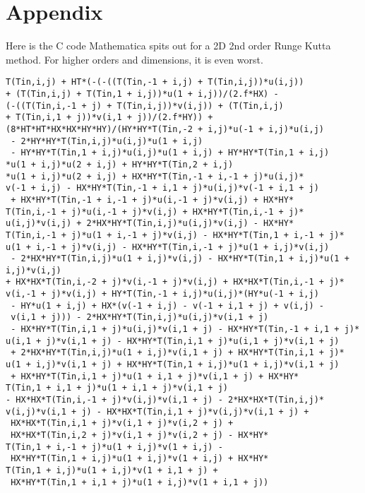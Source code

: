 \documentclass[paper=a4, fontsize=11pt]{scrartcl} %
\numberwithin{equation}{section} %
\numberwithin{figure}{section} %
\numberwithin{table}{section} %
\begin{document}
\newpage

\section{Appendix}
Here is the C code Mathematica spits out for a 2D 2nd order Runge Kutta method. For higher orders and dimensions, it is even worst.
\begin{verbatim}
T(Tin,i,j) + HT*(-(-((T(Tin,-1 + i,j) + T(Tin,i,j))*u(i,j)) 
+ (T(Tin,i,j) + T(Tin,1 + i,j))*u(1 + i,j))/(2.f*HX) - 
(-((T(Tin,i,-1 + j) + T(Tin,i,j))*v(i,j)) + (T(Tin,i,j) 
+ T(Tin,i,1 + j))*v(i,1 + j))/(2.f*HY)) + 
(8*HT*HT*HX*HX*HY*HY)/(HY*HY*T(Tin,-2 + i,j)*u(-1 + i,j)*u(i,j)
 - 2*HY*HY*T(Tin,i,j)*u(i,j)*u(1 + i,j)
 - HY*HY*T(Tin,1 + i,j)*u(i,j)*u(1 + i,j) + HY*HY*T(Tin,1 + i,j)
*u(1 + i,j)*u(2 + i,j) + HY*HY*T(Tin,2 + i,j)
*u(1 + i,j)*u(2 + i,j) + HX*HY*T(Tin,-1 + i,-1 + j)*u(i,j)*
v(-1 + i,j) - HX*HY*T(Tin,-1 + i,1 + j)*u(i,j)*v(-1 + i,1 + j)
 + HX*HY*T(Tin,-1 + i,-1 + j)*u(i,-1 + j)*v(i,j) + HX*HY*
T(Tin,i,-1 + j)*u(i,-1 + j)*v(i,j) + HX*HY*T(Tin,i,-1 + j)*
u(i,j)*v(i,j) + 2*HX*HY*T(Tin,i,j)*u(i,j)*v(i,j) - HX*HY*
T(Tin,i,-1 + j)*u(1 + i,-1 + j)*v(i,j) - HX*HY*T(Tin,1 + i,-1 + j)*
u(1 + i,-1 + j)*v(i,j) - HX*HY*T(Tin,i,-1 + j)*u(1 + i,j)*v(i,j)
 - 2*HX*HY*T(Tin,i,j)*u(1 + i,j)*v(i,j) - HX*HY*T(Tin,1 + i,j)*u(1 + i,j)*v(i,j) 
+ HX*HX*T(Tin,i,-2 + j)*v(i,-1 + j)*v(i,j) + HX*HX*T(Tin,i,-1 + j)*
v(i,-1 + j)*v(i,j) + HY*T(Tin,-1 + i,j)*u(i,j)*(HY*u(-1 + i,j)
 - HY*u(1 + i,j) + HX*(v(-1 + i,j) - v(-1 + i,1 + j) + v(i,j) -
 v(i,1 + j))) - 2*HX*HY*T(Tin,i,j)*u(i,j)*v(i,1 + j)
 - HX*HY*T(Tin,i,1 + j)*u(i,j)*v(i,1 + j) - HX*HY*T(Tin,-1 + i,1 + j)*
u(i,1 + j)*v(i,1 + j) - HX*HY*T(Tin,i,1 + j)*u(i,1 + j)*v(i,1 + j)
 + 2*HX*HY*T(Tin,i,j)*u(1 + i,j)*v(i,1 + j) + HX*HY*T(Tin,i,1 + j)*
u(1 + i,j)*v(i,1 + j) + HX*HY*T(Tin,1 + i,j)*u(1 + i,j)*v(i,1 + j)
 + HX*HY*T(Tin,i,1 + j)*u(1 + i,1 + j)*v(i,1 + j) + HX*HY*
T(Tin,1 + i,1 + j)*u(1 + i,1 + j)*v(i,1 + j) 
- HX*HX*T(Tin,i,-1 + j)*v(i,j)*v(i,1 + j) - 2*HX*HX*T(Tin,i,j)*
v(i,j)*v(i,1 + j) - HX*HX*T(Tin,i,1 + j)*v(i,j)*v(i,1 + j) +
 HX*HX*T(Tin,i,1 + j)*v(i,1 + j)*v(i,2 + j) +
 HX*HX*T(Tin,i,2 + j)*v(i,1 + j)*v(i,2 + j) - HX*HY*
T(Tin,1 + i,-1 + j)*u(1 + i,j)*v(1 + i,j) -
 HX*HY*T(Tin,1 + i,j)*u(1 + i,j)*v(1 + i,j) + HX*HY*
T(Tin,1 + i,j)*u(1 + i,j)*v(1 + i,1 + j) +
 HX*HY*T(Tin,1 + i,1 + j)*u(1 + i,j)*v(1 + i,1 + j)) 
\end{verbatim}
\end{document}

